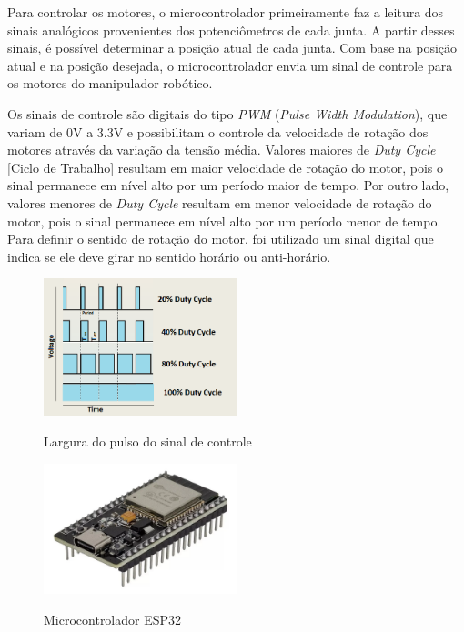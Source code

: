 Para controlar os motores, o microcontrolador primeiramente faz a leitura dos sinais analógicos provenientes dos potenciômetros de cada junta.
A partir desses sinais, é possível determinar a posição atual de cada junta.
Com base na posição atual e na posição desejada, o microcontrolador envia um sinal de controle para os motores do manipulador robótico.

Os sinais de controle são digitais do tipo \textit{PWM} (\textit{Pulse Width Modulation}), que variam de 0V a 3.3V e possibilitam o controle da velocidade de rotação dos motores através da variação da tensão média.
Valores maiores de \textit{Duty Cycle} [Ciclo de Trabalho] resultam em maior velocidade de rotação do motor, pois o sinal permanece em nível alto por um período maior de tempo.
Por outro lado, valores menores de \textit{Duty Cycle} resultam em menor velocidade de rotação do motor, pois o sinal permanece em nível alto por um período menor de tempo.
Para definir o sentido de rotação do motor, foi utilizado um sinal digital que indica se ele deve girar no sentido horário ou anti-horário.

\begin{figure}[H]
    \centering
    \caption{Largura do pulso do sinal de controle}
    \includegraphics[keepaspectratio=true, width=0.5\textwidth]
    	{img/pwm.png}
    \label{fig:pwm}
\end{figure}

\begin{figure}[H]
    \centering
    \caption{Microcontrolador ESP32}
    \includegraphics[keepaspectratio=true, width=0.5\textwidth]
    	{img/foto-esp32.png}
    \label{fig:fotoESP32}
\end{figure}

